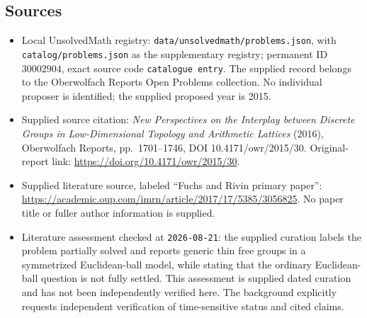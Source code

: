 \documentclass[11pt]{article}
\begin{document}
\subsection{Sources}
\begin{itemize}
\item Local UnsolvedMath registry: \texttt{data/unsolvedmath/problems.json}, with \texttt{catalog/problems.json} as the supplementary registry; permanent ID \(30002904\), exact source code \texttt{catalogue entry}. The supplied record belongs to the Oberwolfach Reports Open Problems collection. No individual proposer is identified; the supplied proposed year is 2015.
\item Supplied source citation: \emph{New Perspectives on the Interplay between Discrete Groups in Low-Dimensional Topology and Arithmetic Lattices} (2016), Oberwolfach Reports, pp.\ 1701--1746, DOI 10.4171/owr/2015/30. Original-report link: \url{https://doi.org/10.4171/owr/2015/30}.
\item Supplied literature source, labeled ``Fuchs and Rivin primary paper'': \url{https://academic.oup.com/imrn/article/2017/17/5385/3056825}. No paper title or fuller author information is supplied.
\item Literature assessment checked at \texttt{2026-08-21}: the supplied curation labels the problem partially solved and reports generic thin free groups in a symmetrized Euclidean-ball model, while stating that the ordinary Euclidean-ball question is not fully settled. This assessment is supplied dated curation and has not been independently verified here. The background explicitly requests independent verification of time-sensitive status and cited claims.
\end{itemize}
\end{document}
